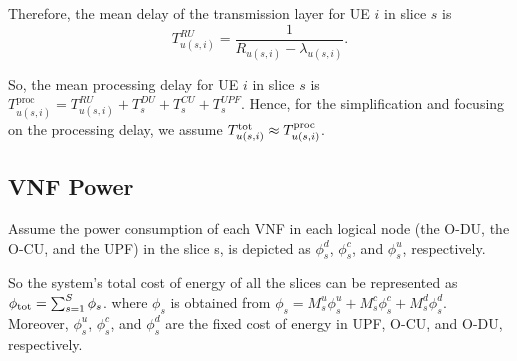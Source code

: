 \documentclass[lettersize,journal]{IEEEtran}
\begin{document}
Therefore, the mean delay of the transmission layer for UE $i$ in slice $s$ is
\begin{equation}
 T_{u(s,i)}^{RU} = \frac{1}{R_{u(s,i)} - \lambda_{u(s,i)}}.
\end{equation}

So, the mean processing delay for UE $i$ in slice $s$ is $T^{\text{proc}}_{u(s,i)} =  T^{RU}_{u(s,i)} + T^{DU}_{s} + T^{CU}_{s} + T^{UPF}_{s}.$
Hence, for the simplification and focusing on the processing delay, we assume $T^{\text{\text{tot}}}_{u(s,i)} \approx T^{\text{proc}}_{u(s,i)} $. %
\subsection{VNF Power}
Assume the power consumption of each VNF in each logical node (the O-DU, the O-CU, and the UPF) in the slice s, is depicted as $\phi_{s}^d$, $\phi_{s}^c$, and $\phi_{s}^u$, respectively. 

So the system's total cost of energy of all the slices can be represented as $\textstyle \phi_{\text{\text{tot}}} = \sum_{s=1}^{S}\phi_{s}$.
where $\phi_{s}$ is obtained from $\phi_{s} = M_s^u \phi_s^u + M_s^c \phi_s^c+ M_s^d \phi_s^d.$
Moreover, $\phi_s^u$, $\phi_s^c$, and $\phi_s^d$ are the fixed cost of energy in UPF, O-CU, and O-DU, respectively. 
\end{document}
